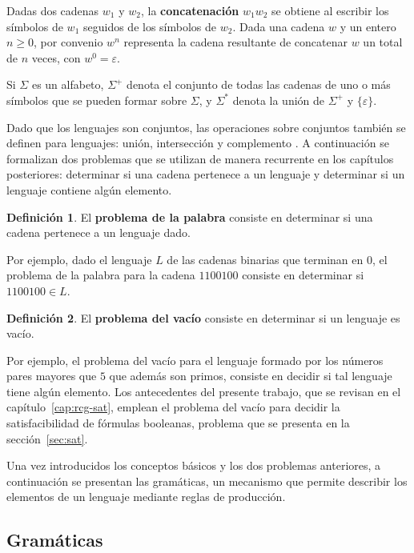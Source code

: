 \documentclass{report}
\theoremstyle{definition}
\newtheorem{definicion}{Definición}[chapter]
\theoremstyle{plain}
\theoremstyle{remark}
\begin{document}
Dadas dos cadenas $w_1$ y $w_2$, la \textbf{concatenación} $w_1 w_2$
se obtiene al escribir los símbolos de $w_1$ seguidos de los símbolos
de $w_2$. Dada una cadena $w$ y un entero $n \ge 0$, por convenio
$w^n$ representa la cadena resultante de concatenar $w$ un total de
$n$ veces, con $w^0 = \varepsilon$.

Si $\Sigma$ es un alfabeto, $\Sigma^+$ denota el conjunto de todas las
cadenas de uno o más símbolos que se pueden formar sobre $\Sigma$, y
$\Sigma^*$ denota la unión de $\Sigma^+$ y $\{\varepsilon\}$.

Dado que los lenguajes son conjuntos, las operaciones sobre conjuntos
también se definen para lenguajes: unión, intersección y complemento
\cite{hopcroft2006introduction}. A continuación se formalizan dos
problemas que se utilizan de manera recurrente en los capítulos
posteriores: determinar si una cadena pertenece a un lenguaje y
determinar si un lenguaje contiene algún elemento.

\begin{definicion}
El \textbf{problema de la palabra} consiste en determinar si una cadena
pertenece a un lenguaje dado.
\end{definicion}

Por ejemplo, dado el lenguaje $L$ de las cadenas binarias que terminan
en $0$, el problema de la palabra para la cadena $1100100$ consiste en
determinar si $1100100 \in L$.

\begin{definicion}
El \textbf{problema del vacío} consiste en determinar si un lenguaje
es vacío.
\end{definicion}

Por ejemplo, el problema del vacío para el lenguaje formado por los
números pares mayores que $5$ que además son primos, consiste en
decidir si tal lenguaje tiene algún elemento. Los antecedentes del
presente trabajo, que se revisan en el capítulo~\ref{cap:rcg-sat},
emplean el problema del vacío para decidir la satisfacibilidad de
fórmulas booleanas, problema que se presenta en la
sección~\ref{sec:sat}.

Una vez introducidos los conceptos básicos y los dos problemas
anteriores, a continuación se presentan las gramáticas, un mecanismo
que permite describir los elementos de un lenguaje mediante reglas de
producción.

\subsection{Gramáticas}
\label{sec:gramaticas}
\end{document}

